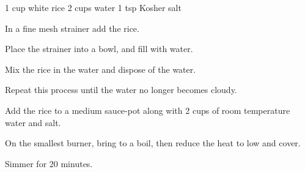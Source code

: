 \dishtype{\vegetarian}
\begin{ingreds}
    1 cup white rice
    2 cups water
    1 tsp Kosher salt          
\end{ingreds}
\begin{method}
    In a fine mesh strainer add the rice.\par
    Place the strainer into a bowl, and fill with water.\par
    Mix the rice in the water and dispose of the water.\par
    Repeat this process until the water no longer becomes cloudy.\par
    Add the rice to a medium sauce-pot along with 2 cups of room temperature water and salt.\par
    On the smallest burner, bring to a boil, then reduce the heat to low and cover.\par Simmer for 20 minutes.
\end{method}